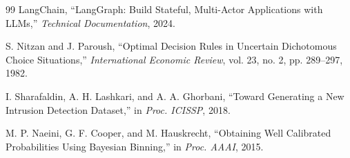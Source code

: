 \documentclass[12pt,a4paper]{report}
\begin{document}
\begin{thebibliography}{99}
LangChain, ``LangGraph: Build Stateful, Multi-Actor Applications with LLMs,'' \textit{Technical Documentation}, 2024.

S. Nitzan and J. Paroush, ``Optimal Decision Rules in Uncertain Dichotomous Choice Situations,'' \textit{International Economic Review}, vol. 23, no. 2, pp. 289--297, 1982.

I. Sharafaldin, A. H. Lashkari, and A. A. Ghorbani, ``Toward Generating a New Intrusion Detection Dataset,'' in \textit{Proc. ICISSP}, 2018.

M. P. Naeini, G. F. Cooper, and M. Hauskrecht, ``Obtaining Well Calibrated Probabilities Using Bayesian Binning,'' in \textit{Proc. AAAI}, 2015.

\end{thebibliography}

%
\end{document}
